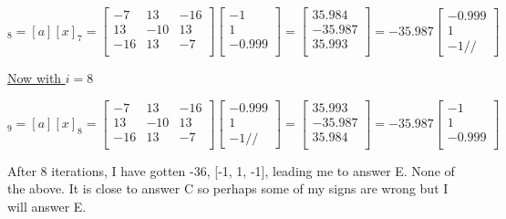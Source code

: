 \documentclass{article}
\begin{document}
\begin{equation*}
[x]_8 = [a][x]_7 =
\begin{bmatrix}
-7 & 13 & -16 \\
13 & -10 & 13 \\
-16 & 13 & -7 \\
\end{bmatrix}
\begin{bmatrix}
-1\\
1\\
-0.999\\
\end{bmatrix}
=
\begin{bmatrix}
35.984\\
-35.987\\
35.993\\
\end{bmatrix}
=-35.987
\begin{bmatrix}
-0.999\\
1\\
-1//
\end{bmatrix}
\end{equation*}

\underline{Now with $i = 8$}


\begin{equation*}
[x]_9 = [a][x]_8 =
\begin{bmatrix}
-7 & 13 & -16 \\
13 & -10 & 13 \\
-16 & 13 & -7 \\
\end{bmatrix}
\begin{bmatrix}
-0.999\\
1\\
-1//
\end{bmatrix}
=
\begin{bmatrix}
35.993\\
-35.987\\
35.984\\
\end{bmatrix}
=-35.987
\begin{bmatrix}
-1\\
1\\
-0.999\\
\end{bmatrix}
\end{equation*}

After 8 iterations, I have gotten -36, [-1, 1, -1], leading me to answer E. None of the above.
It is close to answer C so perhaps some of my signs are wrong but I will answer E.
\end{document}
